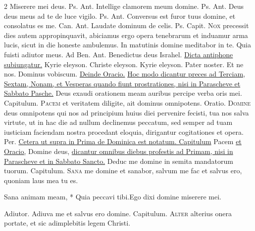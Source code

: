 \begin{multicols*}{2}
 Miserere mei deus. {\color{Red} Ps.}  {\color{Red} Ant.} Intellige clamorem meum domine. {\color{Red} Ps.}  {\color{Red} Ant.} Deus deus meus ad te de luce vigilo. {\color{Red} Ps.}  {\color{Red} Ant.} Conversus est furor tuus domine, et consolatus es me. {\color{Red} Can.}  {\color{Red} Ant.} Laudate dominum de celis. {\color{Red} Ps.}  {\color{Red} Capit.}
\lettrine[lines=2]{\zallmancaps \color{Blue} N}{ox} precessit dies autem appropinquavit, abiciamus ergo opera tenebrarum et induamur arma lucis, sicut in die honeste ambulemus.
\V In matutinis domine meditabor in te. \R Quia fuisti adiutor meus. {\color{Red} Ad Ben. Ant.} Benedictus deus Israhel. \ul{Dicta antiphone subiungatur.} Kyrie eleyson. Christe eleyson. Kyrie eleyson. Pater noster. Et ne nos. Dominus vobiscum. \ul{Deinde Oracio.}
\newline \ul{Hoc modo dicantur preces ad Terciam, Sextam, Nonam, et Vesperas quando fiunt prostrationes, nisi in Parascheve et Sabbato Pasche.}
 Deus exaudi orationem meam auribus percipe verba oris mei. {\color{Red} Capitulum.}
\lettrine[lines=2]{\zallmancaps \color{Red} P}{acem} et veritatem diligite, ait dominus omnipotens. {\color{Red} Oratio.}
\lettrine[lines=2]{\zallmancaps \color{Blue} D}{omine} deus omnipotens qui nos ad principium huius diei pervenire fecisti, tua nos salva virtute, ut in hac die ad nullum declinemus peccatum, sed semper ad tuam iusticiam faciendam nostra procedant eloquia, dirigantur cogitationes et opera. Per. \ul{Cetera ut supra in Prima de Dominica est notatum. Capitulum} Pacem \ul{et Oracio,} Domine deus, \ul{dicantur omnibus diebus profestis ad Primam, nisi in Parascheve et in Sabbato Sancto.}
 Deduc me domine in semita mandatorum tuorum. {\color{Red} Capitulum.}
\lettrine[lines=2]{\zallmancaps \color{Red} S}{ana} me domine et sanabor, salvum me fac et salvus ero, quoniam laus mea tu es.
\begin{responsory-breve}
{Sana animam meam, * Quia peccavi tibi.}{Ego dixi domine miserere mei.}
\end{responsory-breve}%
\V Adiutor.
 Adiuva me et salvus ero domine. {\color{Red} Capitulum.}
\lettrine[lines=2]{\zallmancaps \color{Blue} A}{lter} alterius onera portate, et sic adimplebitis legem Christi.

\end{multicols*}
